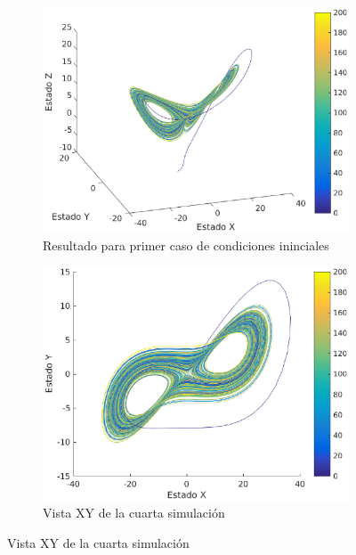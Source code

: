 \documentclass[12pt,letterpaper]{article}
\begin{document}

\begin{figure}
	\centering
	\begin{subfigure}[t]{0.36\textwidth}
		\includegraphics[width=\textwidth]{pictures/cuarta_simulacion}
		\caption{Resultado para primer caso de condiciones ininciales}
		\label{fig:simulacion4}
	\end{subfigure}
	\begin{subfigure}[t]{0.36\textwidth}
		\includegraphics[width=\textwidth]{pictures/cuarta_simulacion_xy}
		\caption{Vista XY de la cuarta simulación}
		\label{fig:simulacion4xy}
	\end{subfigure}

\end{figure}
\end{document}
